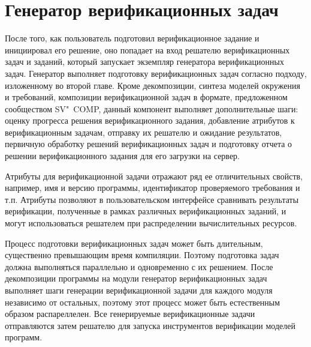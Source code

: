 \section{Генератор верификационных задач}
После того, как пользователь подготовил верификационное задание и инициировал его решение, оно попадает на вход решателю верификационных задач и заданий, который запускает экземпляр генератора верификационных задач.
Генератор выполняет подготовку верификационных задач согласно подходу, изложенному во второй главе. 
Кроме декомпозиции, синтеза моделей окружения и требований, композиции верификационной задач в формате, предложенном сообществом SV"~COMP, данный компонент выполняет дополнительные шаги: оценку прогресса решения верификационного задания, добавление атрибутов к верификационным задачам, отправку их решателю и ожидание результатов, первичную обработку решений верификационных задач и подготовку отчета о решении верификационного задания для его загрузки на сервер.

Атрибуты для верификационной задачи отражают ряд ее отличительных свойств, например, имя и версию программы, идентификатор проверяемого требования и т.п.
Атрибуты позволяют в пользовательском интерфейсе сравнивать результаты верификации, полученные в рамках различных верификационных заданий, и могут использоваться решателем при распределении вычислительных ресурсов.

Процесс подготовки верификационных задач может быть длительным, существенно превышающим время компиляции.
Поэтому подготовка задач должна выполняться параллельно и одновременно с их решением.
После декомпозиции программы на модули генератор верификационных задач выполняет шаги генерации верификационной задачи для каждого модуля независимо от остальных, поэтому этот процесс может быть естественным образом распареллелен.
Все генерируемые верификационные задачи отправляются затем решателю для запуска инструментов верификации моделей программ.

